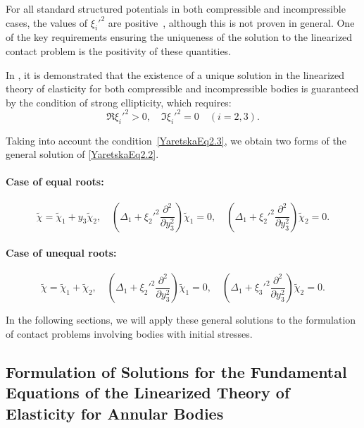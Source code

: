 For all standard structured potentials in both compressible and incompressible cases, the values of $\xi_i'^2$ are positive~\cite{YaretskaRef1}, although this is not proven in general. One of the key requirements ensuring the uniqueness of the solution to the linearized contact problem is the positivity of these quantities.

In \cite{YaretskaRef1,YaretskaRef2,YaretskaRef3,YaretskaRef4,YaretskaRef5,YaretskaRef6,YaretskaRef10,YaretskaRef11,YaretskaRef16}, it is demonstrated that the existence of a unique solution in the linearized theory of elasticity for both compressible and incompressible bodies is guaranteed by the condition of strong ellipticity, which requires:
\begin{equation} \label{YaretskaEq2.3}
	\Re \xi_i'^2 > 0, \quad \Im \xi_i'^2 = 0 \quad (i = 2, 3).
\end{equation}

Taking into account the condition~\eqref{YaretskaEq2.3}, we obtain two forms of the general solution of \eqref{YaretskaEq2.2}.

\paragraph{Case of equal roots:}
\begin{equation} \label{YaretskaEq2.4}
	\tilde{\chi} = \tilde{\chi}_1 + y_3 \tilde{\chi}_2, \quad
	\left( \Delta_1 + \xi_2'^2 \frac{\partial^2}{\partial y_3^2} \right) \tilde{\chi}_1 = 0, \quad
	\left( \Delta_1 + \xi_2'^2 \frac{\partial^2}{\partial y_3^2} \right) \tilde{\chi}_2 = 0.
\end{equation}

\paragraph{Case of unequal roots:}
\begin{equation} \label{YaretskaEq2.5}
	\tilde{\chi} = \tilde{\chi}_1 + \tilde{\chi}_2, \quad
	\left( \Delta_1 + \xi_2'^2 \frac{\partial^2}{\partial y_3^2} \right) \tilde{\chi}_1 = 0, \quad
	\left( \Delta_1 + \xi_3'^2 \frac{\partial^2}{\partial y_3^2} \right) \tilde{\chi}_2 = 0.
\end{equation}

In the following sections, we will apply these general solutions to the formulation of contact problems involving bodies with initial stresses.

\subsection{Formulation of Solutions for the Fundamental Equations of the Linearized Theory of Elasticity for Annular Bodies}

